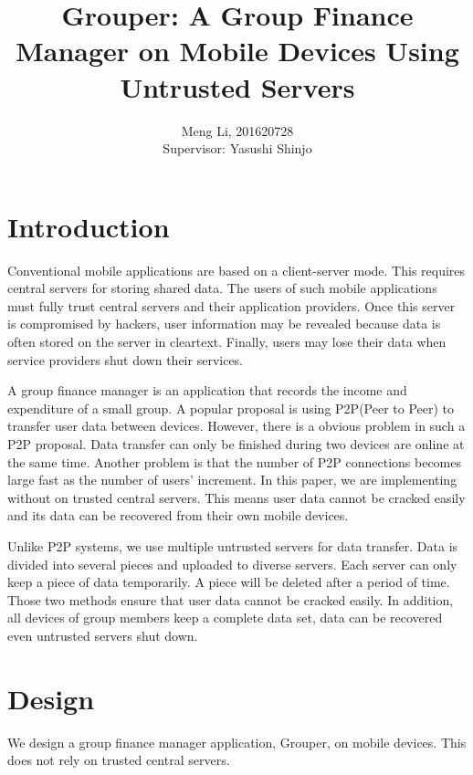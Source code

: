 \documentclass[twocolumn,10pt]{article}
\begin{document}
\date{}

\title{\bf Grouper: A Group Finance Manager on Mobile Devices Using Untrusted Servers}

\author{
	Meng Li, 201620728  
	\\ Supervisor: Yasushi Shinjo
}

\maketitle

\section{Introduction}
Conventional mobile applications are based on a client-server mode. This requires central servers for storing shared data. The users of such mobile applications must fully trust central servers and their application providers. Once this server is compromised by hackers, user information may be revealed because data is often stored on the server in cleartext. Finally, users may lose their data when service providers shut down their services. 

A group finance manager is an application that records the income and expenditure of a small group. A popular proposal is using P2P(Peer to Peer) to transfer user data between devices. However, there is a obvious problem in such a P2P proposal. Data transfer can only be finished during two devices are online at the same time. Another problem is that the number of P2P connections becomes large  fast as the number of users' increment.  In this paper, we are implementing without on trusted central servers. This means user data cannot be cracked easily and its data can be recovered from their own mobile devices. 

Unlike P2P systems, we use multiple untrusted servers for data transfer. Data is divided into several pieces and uploaded to diverse servers. Each server can only keep a piece of data temporarily. A piece will be deleted after a period of time. Those two methods ensure that user data cannot be cracked easily. In addition, all devices of group members keep a complete data set, data can be recovered even untrusted servers shut down.

\section{Design}

We design a group finance manager application, Grouper, on mobile devices. This does not rely on trusted central servers. 
\end{document}
